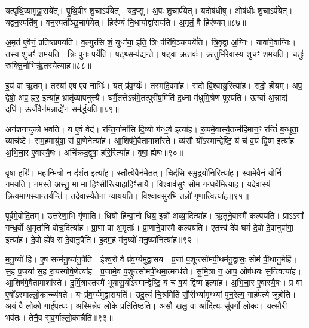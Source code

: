 यत्पृ॑थि॒व्यामु॑द्वा॒सये᳚त्। 
पृ॒थि॒वीꣳ शु॒चाऽर्प॑येत्। 
यद॒प्सु। 
अ॒पः  शु॒चार्प॑येत्। 
यदोष॑धीषु। 
ओष॑धीः  शु॒चाऽर्प॑येत्। 
यद्वन॒स्पति॑षु। 
वन॒स्पती᳚ञ्छु॒चार्प॑येत्। 
हिर॑ण्यं नि॒धायोद्वा॑सयति। 
अ॒मृतं॒ वै हिर॑ण्यम्॥८७॥

अ॒मृत॑ ए॒वैनं॒ प्रति॑ष्ठापयति। 
व॒ल्गुर॑सि शं॒ युधा॑या॒ इति॒ त्रिः प॑रिषि॒ञ्चन्पर्ये॑ति। 
त्रि॒वृद्वा अ॒ग्निः। 
यावा॑ने॒वाग्निः। 
तस्य॒ शुचꣳ॑ शमयति। 
त्रिः पुनः॒ पर्ये॑ति। 
षट्थ्सम्प॑द्यन्ते। 
षड्वा ऋ॒तवः॑। 
ऋ॒तुभि॑रे॒वास्य॒ शुचꣳ॑ शमयति। 
चतुः॑ स्रक्ति॒र्नाभि॑र्\mbox{}ऋ॒तस्येत्या॑ह॥८८॥

इ॒यं वा ऋ॒तम्। 
तस्या॑ ए॒ष ए॒व नाभिः॑। 
यत् प्र॑व॒र्ग्यः॑। 
तस्मा॑दे॒वमा॑ह। 
सदो॑ वि॒श्वायु॒रित्या॑ह। 
सदो॒ हीयम्। 
अप॒ द्वेषो॒ अप॒ ह्वर॒ इत्या॑ह॒ भ्रातृ॑व्यापनुत्त्यै। 
घर्मै॒तत्तेऽन्न॑मे॒तत्पुरी॑ष॒मिति॑ द॒ध्ना म॑धुमि॒श्रेण॑ पूरयति। 
ऊर्ग्वा अ॒न्नाद्यं॒ दधि॑। 
ऊ॒र्जैवैन॑म॒न्नाद्ये॑न॒ सम॑र्द्धयति॥८९॥

अन॑शनायुको भवति। 
य ए॒वं वेद॑। 
रन्ति॒र्नामा॑सि दि॒व्यो ग॑न्ध॒र्व इत्या॑ह। 
रू॒पमे॒वास्यै॒तन्म॑हि॒मान॒ꣳ॒ रन्तिं॑ ब॒न्धुतां॒ व्याच॑ष्टे। 
सम॒हमायु॑षा॒ सं प्रा॒णेनेत्या॑ह। 
आ॒शिष॑मे॒वैतामाशा᳚स्ते। 
व्य॑सौ यो᳚ऽस्मान्द्वेष्टि॒ यं च॑ व॒यं द्वि॒ष्म इत्या॑ह। 
अ॒भि॒चा॒र ए॒वास्यै॒षः। 
अचि॑क्रद॒द्वृषा॒ हरि॒रित्या॑ह। 
वृषा॒ ह्ये॑षः॥९०॥

वृषा॒ हरिः॑। 
म॒हान्मि॒त्रो न द॑र्\mbox{}श॒त इत्या॑ह। 
स्तौत्ये॒वैन॑मे॒तत्। 
चिद॑सि समु॒द्रयो॑नि॒रित्या॑ह। 
स्वामे॒वैनं॒ योनिं॑ गमयति। 
नम॑स्ते अस्तु॒ मा मा॑ हिꣳसी॒रित्या॒हाहिꣳ॑सायै। 
वि॒श्वाव॑सुꣳ सोम गन्ध॒र्वमित्या॑ह। 
यदे॒वास्य॑ क्रि॒यमा॑णस्यान्त॒र्यन्ति॑। 
तदे॒वास्यै॒तेना प्या॑ययति। 
वि॒श्वाव॑सुर॒भि तन्नो॑ गृणा॒त्वि\-त्या॑ह॥९१॥

पूर्व॑मे॒वोदि॒तम्। 
उत्त॑रेणा॒भि गृ॑णाति। 
धियो॑ हिन्वा॒नो धिय॒ इन्नो॑ अव्या॒दित्या॑ह। 
ऋ॒तूने॒वास्मै॑ कल्पयति। 
प्राऽऽसां᳚ गन्ध॒र्वो अ॒मृता॑नि वोच॒दित्या॑ह। 
प्रा॒णा वा अ॒मृताः᳚। 
प्रा॒णाने॒वास्मै॑ कल्पयति। 
ए॒तत्त्वं दे॑व घर्म दे॒वो दे॒वानुपा॑गा॒ इत्या॑ह। 
दे॒वो ह्ये॑ष सं दे॒वानु॒पैति॑। 
इ॒दम॒हं म॑नु॒ष्यो॑ मनु॒ष्या॑नित्या॑ह॥९२॥

म॒नु॒ष्यो॑ हि। 
ए॒ष सन्म॑नु॒ष्या॑नु॒पैति॑। 
ई॒श्व॒रो वै प्र॑व॒र्ग्य॑मुद्वा॒सय\sn{}। 
प्र॒जां प॒शून्त्सो॑मपी॒थम॑नू॒द्वासः॒ सोम॑ पी॒थानु॒मेहि॑। 
स॒ह प्र॒जया॑ स॒ह रा॒यस्पोषे॒णेत्या॑ह। 
प्र॒जामे॒व प॒शून्त्सो॑मपी॒थमा॒त्मन्ध॑त्ते। 
सु॒मि॒त्रा न॒ आप॒ ओष॑धयः स॒न्त्वित्या॑ह। 
आ॒शिष॑मे॒वैतामाशा᳚स्ते। 
दु॒र्मि॒त्रास्तस्मै॑ भूयासु॒र्यो᳚ऽस्मान्द्वेष्टि॒ यं च॑ व॒यं द्वि॒ष्म इत्या॑ह। 
अ॒भि॒चा॒र ए॒वास्यै॒षः। 
प्र वा ए॒षो᳚ऽस्माल्लो॒काच्च्य॑वते। 
यः प्र॑व॒र्ग्य॑मुद्वा॒सयति॑। 
उदु॒त्यं चि॒त्रमिति॑ सौ॒रीभ्या॑मृ॒ग्भ्यां पुन॒रेत्य॒ गार्\mbox{}ह॑पत्ये जुहोति। 
अ॒यं वै लो॒को गार्\mbox{}ह॑पत्यः। 
अ॒स्मिन्ने॒व लो॒के प्रति॑तिष्ठति। 
अ॒सौ खलु॒ वा आ॑दि॒त्यः सु॑व॒र्गो लो॒कः। 
यत्सौ॒री भव॑तः। 
तेनै॒व सु॑व॒र्गाल्लो॒कान्नैति॑॥९३॥
\anuvakamend[ब्रह्म॑णस्त्वा पर॒स्पाया॒ इत्या॑ह दधात्य॒न्वित्य॑ रक्ष॒स्वी रक्ष॑सा॒मप॑हत्यै॒ वै हिर॑ण्यमाहार्द्धयति॒ ह्ये॑ष गृ॑णा॒त्वित्या॑ह मनु॒ष्या॑नित्या॑हास्यै॒षो᳚ऽष्टौ च॑]

